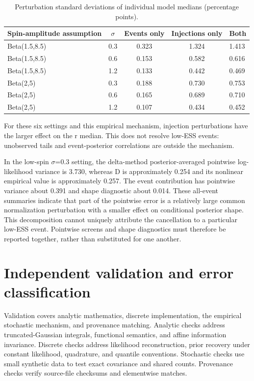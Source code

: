 \documentclass[a4paper,11pt]{article}
\begin{document}
\begin{table}[tbp]
\centering\small
\caption{Perturbation standard deviations of individual model medians (percentage points).}\label{tab:4}
\begin{tabularx}{\linewidth}{Y c c c Y}
\toprule
Spin-amplitude assumption & \(\sigma\) & Events only & Injections only & Both \\
\midrule
Beta(1.5,8.5) & 0.3 & 0.323 & 1.324 & 1.413 \\
Beta(1.5,8.5) & 0.6 & 0.153 & 0.582 & 0.616 \\
Beta(1.5,8.5) & 1.2 & 0.133 & 0.442 & 0.469 \\
Beta(2,5) & 0.3 & 0.188 & 0.730 & 0.753 \\
Beta(2,5) & 0.6 & 0.165 & 0.689 & 0.710 \\
Beta(2,5) & 1.2 & 0.107 & 0.434 & 0.452 \\
\bottomrule
\end{tabularx}
\end{table}
For these six settings and this empirical mechanism, injection perturbations have the larger effect on the r median. This does not resolve low-ESS events: unobserved tails and event-posterior correlations are outside the mechanism.

In the low-spin \(\sigma\)=0.3 setting, the delta-method posterior-averaged pointwise log-likelihood variance is 3.730, whereas D is approximately 0.254 and its nonlinear empirical value is approximately 0.257. The event contribution has pointwise variance about 0.391 and shape diagnostic about 0.014. These all-event summaries indicate that part of the pointwise error is a relatively large common normalization perturbation with a smaller effect on conditional posterior shape. This decomposition cannot uniquely attribute the cancellation to a particular low-ESS event. Pointwise screens and shape diagnostics must therefore be reported together, rather than substituted for one another.

\FloatBarrier
\section{Independent validation and error classification}\label{sec:8}
Validation covers analytic mathematics, discrete implementation, the empirical stochastic mechanism, and provenance matching. Analytic checks address truncated-Gaussian integrals, functional semantics, and affine information invariance. Discrete checks address likelihood reconstruction, prior recovery under constant likelihood, quadrature, and quantile conventions. Stochastic checks use small synthetic data to test exact covariance and shared counts. Provenance checks verify source-file checksums and elementwise matches.
\end{document}
